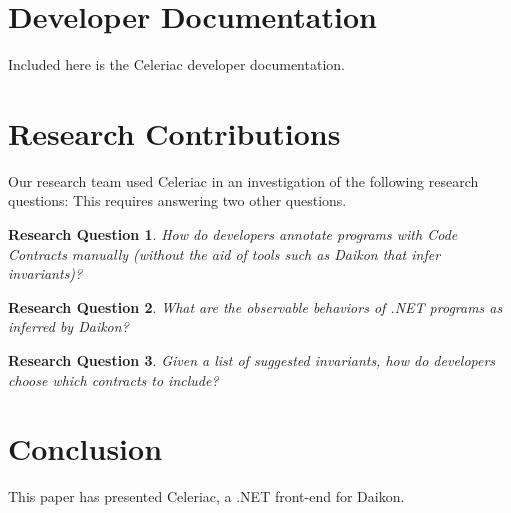 \documentclass{article}
\newtheorem{research-question}{Research Question}[section]
\begin{document}
\newpage
\section{Developer Documentation}
Included here is the Celeriac developer documentation. 

\newpage
\section{Research Contributions}
Our research team used Celeriac in an investigation of the following research questions:
This requires answering two other questions.
\begin{research-question}
  How do developers annotate programs with Code Contracts manually (without the aid of tools such as Daikon that infer invariants)?
\end{research-question}
\begin{research-question}
  What are the observable behaviors of .NET programs as inferred by Daikon?
\end{research-question}
\begin{research-question}
  Given a list of suggested invariants, how do developers choose which contracts to include?
\end{research-question}




\section{Conclusion}
This paper has presented Celeriac, a .NET front-end for Daikon.

\newpage


\end{document}
